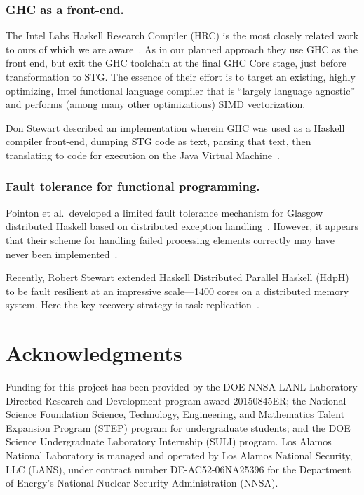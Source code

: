 \documentclass{llncs}
\begin{document}
\subsubsection{GHC as a front-end.}
The Intel Labs Haskell Research Compiler (HRC) is the most closely related
work to ours of which we are aware~\cite{Liu:2013,Petersen:2013}.  As in our
planned approach they use GHC as the front end, but exit the GHC toolchain
at the final GHC Core stage, just before transformation to STG.  The essence
of their effort is to target an existing, highly optimizing, Intel functional
language compiler that is ``largely language agnostic'' and performs (among
many other optimizations) SIMD vectorization.

Don Stewart described an implementation wherein GHC was used as a Haskell compiler
front-end, dumping STG code as text, parsing that text, then translating to
code for execution on the Java Virtual Machine~\cite{Stewart-BSc}.

\subsubsection{Fault tolerance for functional programming.}
Pointon et al.\ developed a limited fault tolerance mechanism for Glasgow
distributed Haskell based on distributed exception
handling~\cite{Pointon:2001}.  However, it appears that their scheme for
handling failed processing elements correctly may have
never been implemented~\cite{Trinder:2000}.

Recently, Robert Stewart extended Haskell Distributed Parallel Haskell
(HdpH)~\cite{hdph} to be fault resilient at an impressive scale---1400 cores
on a distributed memory system.  Here the key recovery strategy is task
replication~\cite{Stewart:2013}.

\section{Acknowledgments}

Funding for this project has been provided by the DOE NNSA LANL Laboratory
Directed Research and Development program award 20150845ER; the National
Science Foundation Science, Technology, Engineering, and Mathematics Talent
Expansion Program (STEP) program for undergraduate students; and the DOE
Science Undergraduate Laboratory Internship (SULI) program.
%
Los Alamos National Laboratory is managed and operated by Los Alamos National
Security, LLC (LANS), under contract number DE-AC52-06NA25396 for the
Department of Energy's National Nuclear Security Administration (NNSA).
\end{document}
